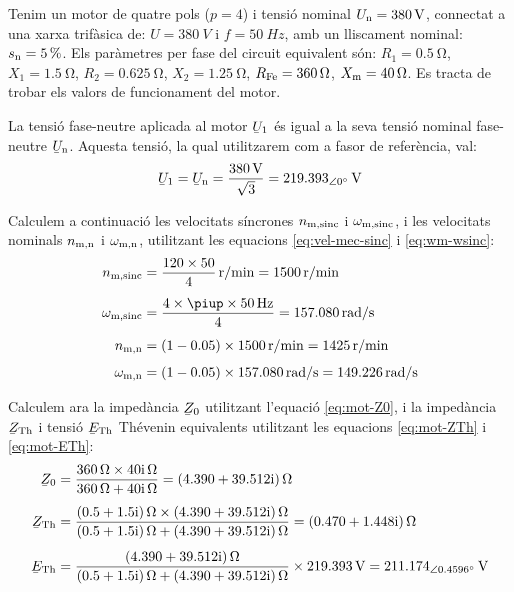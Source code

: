 \begin{exemple}\label{ex:CaractMotor}
	\addcontentsxms{\CaractMotor}	
    Tenim un motor de quatre pols ($p=4$) i tensió nominal $U_\mathrm{n}=\qty{380}{V}$, connectat a una xarxa trifàsica de: $U=\qty{380}{V}$ i $f=\qty{50}{Hz}$, amb un lliscament nominal: $s_\mathrm{n}=\qty{5}{\percent}$. Els paràmetres per fase del circuit equivalent són: $R_1=\qty{0,5}{\ohm}$, $X_1=\qty{1,5}{\ohm}$, $R_2=\qty{0,625}{\ohm}$, $X_2=\qty{1,25}{\ohm}$, $R_\mathrm{Fe}=\qty{360}{\ohm}$, $X_\mathrm{m}=\qty{40}{\ohm}$. Es tracta de trobar els valors de funcionament del motor.

    La tensió fase-neutre aplicada al motor $\cmplx{U}_1$ és igual a la seva tensió nominal  fase-neutre  $\cmplx{U}\ped{n}$. Aquesta tensió, la qual utilitzarem com a fasor de referència, val:
    \[
        \cmplx{U}_1 = \cmplx{U}\ped{n} = \frac{\qty{380}{V}}{\sqrt{3}} = \qtypd{219,393}{0}{V}
    \]

    Calculem a continuació les velocitats síncrones $n_\mathrm{m,sinc}$ i $\omega_\mathrm{m,sinc}$, i les velocitats nominals $n_\mathrm{m,n}$ i $\omega_\mathrm{m,n}$, utilitzant les equacions \eqref{eq:vel-mec-sinc} i \eqref{eq:wm-wsinc}:
    \begin{align*}
        n\ped{m,sinc} &= \frac{120\times 50}{4} \, \unit{r/min} = \qty{1500}{r/min} \\[1ex]
        \omega\ped{m,sinc} &= \frac{4 \times\piup \times\qty{50}{Hz}}{4} =  \qty{157,080}{rad/s} \\[1ex]
        n\ped{m,n} &= (1-\num{0,05})\times \qty{1500}{r/min} = \qty{1425}{r/min} \\[1ex]
        \omega\ped{m,n} &= (1-\num{0,05}) \times\qty{157,080}{rad/s} = \qty{149,226}{rad/s}
    \end{align*}

    Calculem ara la impedància $\cmplx{Z}_0$ utilitzant l'equació \eqref{eq:mot-Z0}, i la impedància $\cmplx{Z}\ped{Th}$ i tensió $\cmplx{E}\ped{Th}$ Thévenin equivalents utilitzant les equacions \eqref{eq:mot-ZTh} i \eqref{eq:mot-ETh}:
     \begin{align*}
        \cmplx{Z}_0 &= \frac{\qty{360}{\ohm}\times\complexqty{j40}{\ohm}}{\qty{360}{\ohm}+\complexqty{j40}{\ohm}} = \complexqty{4,390+j39,512}{\ohm} \\[1ex]
        \cmplx{Z}\ped{Th} &= \frac{\complexqty{0,5+j1,5}{\ohm}\times\complexqty{4,390+j39,512}{\ohm}}
        {\complexqty{0,5+j1,5}{\ohm}+\complexqty{4,390+j39,512}{\ohm}} =  \complexqty{0,470+j1,448}{\ohm} \\[1ex]
        \cmplx{E}\ped{Th}  &= \frac{\complexqty{4,390+j39,512}{\ohm}}
        {\complexqty{0,5+j1,5}{\ohm}+\complexqty{4,390+j39,512}{\ohm}}\times\qty{219,393}{V} =  \qtypd{211,174}{0,4596}{V}
    \end{align*}


\end{exemple}
